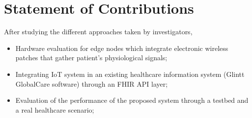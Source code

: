\section{Statement of Contributions}


After studying the different approaches taken by investigators, 
\begin{itemize}
    \item Hardware evaluation for edge nodes which integrate electronic wireless patches that gather patient's physiological signals;
    \item Integrating IoT system in an existing healthcare information system (Glintt GlobalCare software) through an FHIR API layer;
    \item Evaluation of the performance of the proposed system through a testbed and a real healthcare scenario;
\end{itemize}
